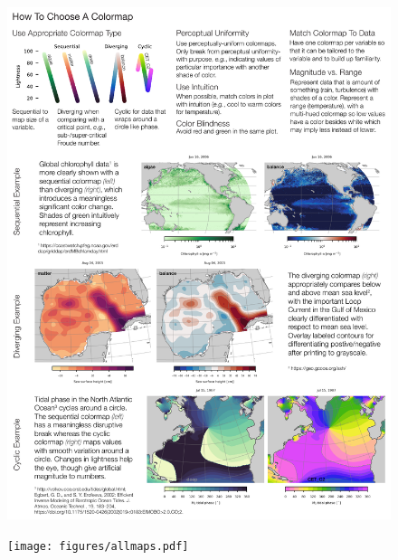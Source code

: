 \documentclass[10pt,journal,compsoc]{IEEEtran}
\begin{document}
\begin{figure}
	\includegraphics[width=\textwidth]{figures/howtochoose.pdf}
	\caption{}
	\label{fig:howtochoose}
\end{figure}

\begin{figure}
	\texttt{[image: figures/allmaps.pdf]}
	\caption{}
	\label{fig:allmaps}
\end{figure}
\end{document}
